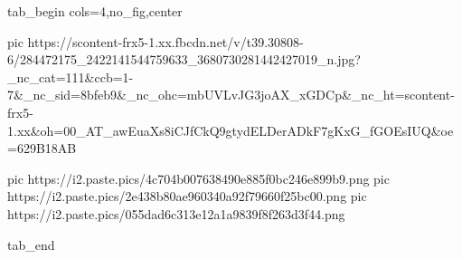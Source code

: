  
 
 
 
 

\ifcmt
  tab_begin cols=4,no_fig,center

     pic https://scontent-frx5-1.xx.fbcdn.net/v/t39.30808-6/284472175_2422141544759633_3680730281442427019_n.jpg?_nc_cat=111&ccb=1-7&_nc_sid=8bfeb9&_nc_ohc=mbUVLvJG3joAX_xGDCp&_nc_ht=scontent-frx5-1.xx&oh=00_AT_awEuaXs8iCJfCkQ9gtydELDerADkF7gKxG_fGOEsIUQ&oe=629B18AB

		 pic https://i2.paste.pics/4c704b007638490e885f0bc246e899b9.png
		 pic https://i2.paste.pics/2e438b80ae960340a92f79660f25bc00.png
		 pic https://i2.paste.pics/055dad6c313e12a1a9839f8f263d3f44.png

  tab_end
\fi

